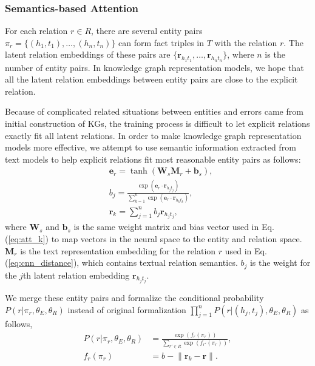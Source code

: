 \documentclass[letterpaper]{article} %
\begin{document}
\subsubsection{Semantics-based Attention}

For each relation $r \in R$, there are several entity pairs $\pi_r = \{(h_1, t_1), \ldots , (h_n, t_n)\}$ can form fact triples in $T$ with the relation $r$. The latent relation embeddings of these pairs are $\{\mathbf{r}_{h_1t_1}, \ldots , \mathbf{r}_{h_nt_n}\}$, where $n$ is the number of entity pairs. In knowledge graph representation models, we hope that all the latent relation embeddings between entity pairs are close to the explicit relation. 

Because of complicated related situations between entities and errors came from initial construction of KGs, the training process is difficult to let explicit relations exactly fit all latent relations. In order to make knowledge graph representation models more effective, we attempt to use semantic information extracted from text models to help explicit relations fit most reasonable entity pairs as follows:
\begin{align}
&\mathbf{e}_r  = \tanh(\mathbf{W}_s\mathbf{M}_r+\mathbf{b}_s), \\\nonumber
&b_j  =\frac{\exp(\mathbf{e}_{r}\cdot\mathbf{r}_{h_jt_j})}{\sum_{k = 1}^{n} \exp(\mathbf{e}_{r}\cdot\mathbf{r}_{h_kt_k})}, \\\nonumber
&\mathbf{r}_{k}  = \sum_{j = 1}^{n} b_j\mathbf{r}_{h_jt_j},
\end{align}
where $\mathbf{W}_s$ and $\mathbf{b}_s$ is the same weight matrix and bias vector used in Eq. (\ref{eq:att_k}) to map vectors in the neural space to the entity and relation space. $\mathbf{M}_r$ is the text representation embedding for the relation $r$ used in Eq. (\ref{eq:cnn_distance}), which contains textual relation semantics. $b_j$ is the weight for the $j$th latent relation embedding $\mathbf{r}_{h_jt_j}$.

We merge these entity pairs and formalize the conditional probability $P(r|\pi_r,{\theta_E, \theta_R})$ instead of original formalization $\prod_{j=1}^{n}P(r|(h_j, t_j),{\theta_E, \theta_R})$ as follows,
\begin{align}
P(r|\pi_r,{\theta_E, \theta_R}) &= \frac{\exp(f_r(\pi_r))}{\sum_{{r'} \in R} \exp(f_{r'}(\pi_r))},\\\nonumber
f_r(\pi_r) &= b - \lVert \textbf{r}_{k} - \textbf{r} \rVert.
\end{align}
\end{document}
